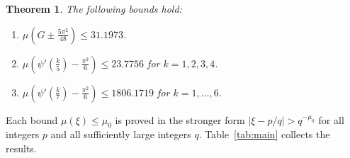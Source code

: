 \documentclass[11pt]{amsart}
\newtheorem{theorem}{Theorem}[section]
\theoremstyle{definition}
\theoremstyle{remark}
\numberwithin{equation}{section}
\newcommand{\MuLamU}{31.1973}
\newcommand{\MuFifthsU}{23.7756}
\newcommand{\MuSeventhsU}{1806.1719}
\begin{document}
\begin{theorem}\label{thm:main}\label{thm:offplane}
The following bounds hold:
\begin{enumerate}[label=(\roman*),leftmargin=*]
\item $\mu(G\pm\frac{5\pi^2}{48})\le\MuLamU$.
\item $\mu(\psi'(\frac k5)-\frac{\pi^2}6)\le\MuFifthsU$ for $k=1,2,3,4$.
\item $\mu(\psi'(\frac k7)-\frac{\pi^2}6)\le\MuSeventhsU$ for $k=1,\dots,6$.
\end{enumerate}
\end{theorem}

Each bound $\mu(\xi)\le\mu_0$ is proved in the stronger form $|\xi-p/q|>q^{-\mu_0}$ for all integers $p$ and all
sufficiently large integers $q$. Table~\ref{tab:main} collects the results.
\end{document}

